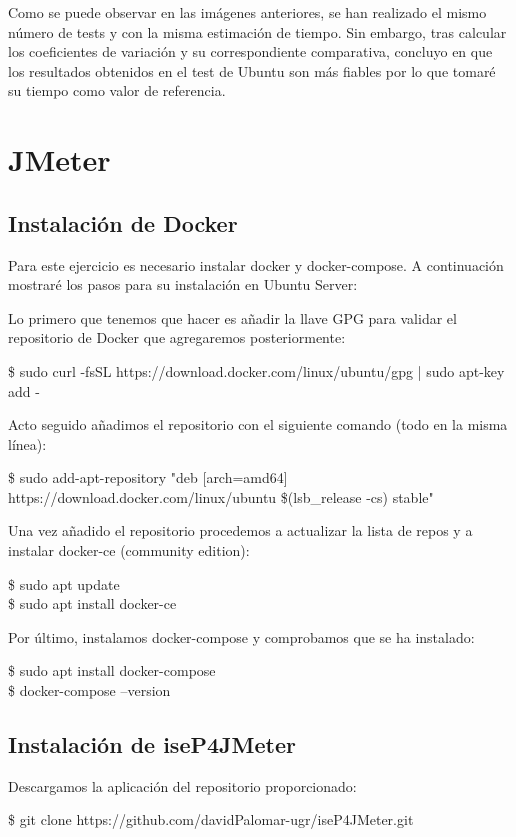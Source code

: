 Como se puede observar en las imágenes anteriores, se han realizado el mismo número de tests y con la misma estimación de tiempo. Sin embargo, tras calcular los 
coeficientes de variación y su correspondiente comparativa, concluyo en que los resultados obtenidos en el test de Ubuntu son más fiables por lo que tomaré su
tiempo como valor de referencia.

\section{JMeter}
\subsection{Instalación de Docker}
Para este ejercicio es necesario instalar docker y docker-compose. A continuación mostraré los pasos para su instalación en Ubuntu Server:

Lo primero que tenemos que hacer es añadir la llave GPG para validar el repositorio de Docker que agregaremos posteriormente:
\begin{tcolorbox}[colback=black!10, halign=left]
    \$ sudo curl -fsSL https://download.docker.com/linux/ubuntu/gpg | sudo apt-key add -
\end{tcolorbox}

Acto seguido añadimos el repositorio con el siguiente comando (todo en la misma línea):
\begin{tcolorbox}[colback=black!10, halign=left]
    \$ sudo add-apt-repository "deb [arch=amd64] https://download.docker.com/linux/ubuntu \$(lsb\_release -cs) stable"
\end{tcolorbox}

Una vez añadido el repositorio procedemos a actualizar la lista de repos y a instalar docker-ce (community edition):
\begin{tcolorbox}[colback=black!10, halign=left]
    \$ sudo apt update \\
    \$ sudo apt install docker-ce
\end{tcolorbox}

Por último, instalamos docker-compose y comprobamos que se ha instalado:
\begin{tcolorbox}[colback=black!10, halign=left]
    \$ sudo apt install docker-compose \\
    \$ docker-compose --version
\end{tcolorbox}

\subsection{Instalación de iseP4JMeter}
Descargamos la aplicación del repositorio proporcionado:
\begin{tcolorbox}[colback=black!10, halign=left]
    \$ git clone https://github.com/davidPalomar-ugr/iseP4JMeter.git
\end{tcolorbox}

